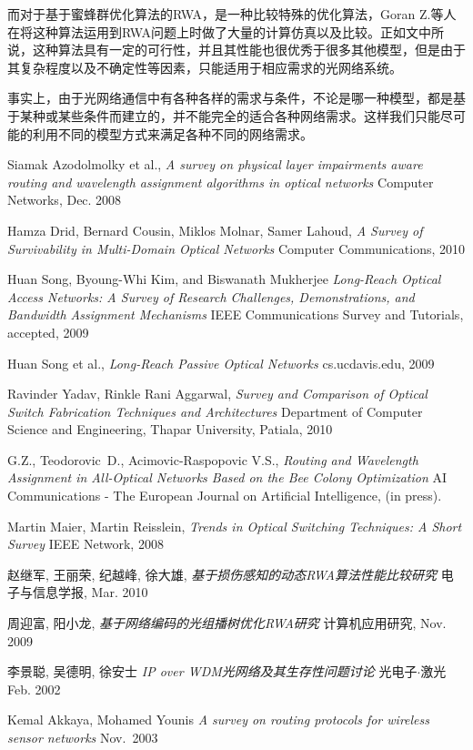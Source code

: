 \documentclass[11pt,twocolumn]{ctexart}
\begin{document}
而对于基于蜜蜂群优化算法的RWA，是一种比较特殊的优化算法，Goran Z.等人在将这种算法运用到RWA问题上时做了大量的计算仿真以及比较\cite{6}。正如文中所说，这种算法具有一定的可行性，并且其性能也很优秀于很多其他模型，但是由于其复杂程度以及不确定性等因素，只能适用于相应需求的光网络系统。

事实上，由于光网络通信中有各种各样的需求与条件，不论是哪一种模型，都是基于某种或某些条件而建立的，并不能完全的适合各种网络需求。这样我们只能尽可能的利用不同的模型方式来满足各种不同的网络需求。



{}
\begin{thebibliography}{99}
 Siamak Azodolmolky et al.,
	{\it A survey on physical layer impairments aware routing and wavelength assignment algorithms in optical networks}
	Computer Networks, Dec. 2008
	
 Hamza Drid, Bernard Cousin, Miklos Molnar, Samer Lahoud,
	{\it A Survey of Survivability in Multi-Domain Optical Networks}
	Computer Communications, 2010 
	
 Huan Song, Byoung-Whi Kim, and Biswanath Mukherjee 
	{\it Long-Reach Optical Access Networks: A Survey of Research Challenges, Demonstrations, and Bandwidth Assignment Mechanisms}
	 IEEE Communications Survey and Tutorials, accepted, 2009

 Huan Song et al.,
	{\it Long-Reach Passive Optical Networks}
	cs.ucdavis.edu, 2009
	
 Ravinder Yadav, Rinkle Rani Aggarwal,
	{\it Survey and Comparison of Optical Switch Fabrication Techniques and Architectures}
	Department of Computer Science and Engineering, Thapar University, Patiala, 2010
	
 G.Z., Teodorovic~D., Acimovic-Raspopovic V.S.,
	{\it Routing and Wavelength Assignment in All-Optical Networks Based on the Bee Colony Optimization}
	AI Communications - The European Journal on Artificial Intelligence, (in press).
	 
 Martin Maier, Martin Reisslein,
	{\it Trends in Optical Switching Techniques: A Short Survey}
	IEEE Network, 2008

 赵继军, 王丽荣, 纪越峰, 徐大雄,
	{\it 基于损伤感知的动态RWA算法性能比较研究}
	电子与信息学报, Mar. 2010

 周迎富, 阳小龙,
	{\it 基于网络编码的光组播树优化RWA研究}
	计算机应用研究, Nov. 2009

 李景聪, 吴德明, 徐安士
	{\it IP over WDM光网络及其生存性问题讨论}
	光电子$\cdot$激光 Feb. 2002
	
 Kemal Akkaya, Mohamed Younis 
	{\it A survey on routing protocols for wireless sensor networks}
	Nov.~2003
	
\end{thebibliography}
\end{document}
